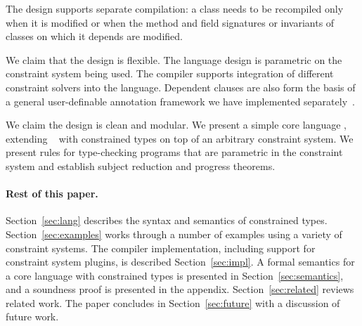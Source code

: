 The design supports separate compilation: a class needs to be
recompiled only when it is modified or when the method
and field signatures or invariants of classes on which it
depends are modified.

We claim that the design is flexible. The language design is
parametric on the constraint system being used.
The compiler supports
integration of
different constraint solvers into the language.
Dependent clauses are also form
the basis of a general user-definable annotation framework we have
implemented separately~\cite{ns07-x10anno}. 

We claim the design is clean and modular. We present a simple core
language \CFJ, extending \FJ{}~\cite{FJ} with constrained types on top
of an arbitrary constraint system. We present rules for type-checking
\CFJ{} programs that are parametric in the constraint system
and establish subject reduction and progress theorems. 

%

\paragraph{Rest of this paper.}

Section~\ref{sec:lang} describes the syntax and semantics of
constrained types.
Section~\ref{sec:examples} works through a number of
examples using a variety of constraint systems.
The compiler implementation, including support for constraint
system plugins, is described Section~\ref{sec:impl}.
A formal semantics for a core language with constrained types 
is presented in Section~\ref{sec:semantics}, and a soundness
proof is presented in the appendix.
Section~\ref{sec:related} reviews related work.
The paper concludes in Section~\ref{sec:future}
with a discussion of future work.


